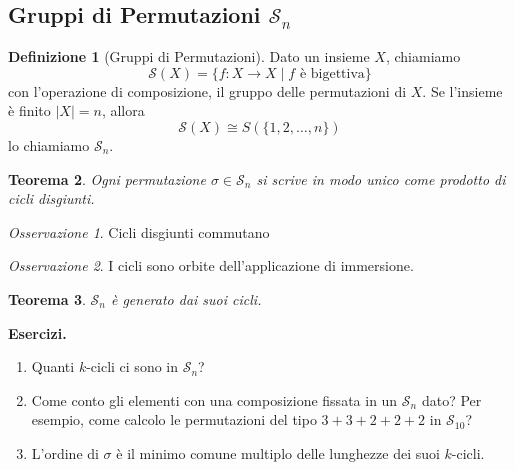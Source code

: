 \documentclass[a4paper]{article}
\newtheorem{theorem}{Teorema}[section]
\theoremstyle{remark}
\newtheorem*{remark}{Osservazione}
\theoremstyle{definition}
\newtheorem{definition}[theorem]{Definizione}
\begin{document}
\subsection{Gruppi di Permutazioni $ \mathcal{S}_n $}
\begin{multicols}{2}
\begin{definition}[Gruppi di Permutazioni]
	Dato un insieme $ X $, chiamiamo
	\[  \mathcal{S}(X) = \{ f: X \to X \mid f  \text{ è bigettiva}  \}  \]
	con l'operazione di composizione, il gruppo delle permutazioni di $ X $. Se l'insieme è finito $ |X| = n $, allora
	\[  \mathcal{S}(X) \cong S(\{ 1 ,2, \dots, n \})  \]
	lo chiamiamo $ \mathcal{S}_n $.
\end{definition}

\begin{theorem}
	Ogni permutazione $ \sigma \in \mathcal{S}_n $ si scrive in modo unico come prodotto di cicli disgiunti.
\end{theorem}
\begin{remark}
	Cicli disgiunti commutano
\end{remark}

\begin{remark}
	I cicli sono orbite dell'applicazione di immersione. 
\end{remark}

\begin{theorem}
	$ \mathcal{S}_n $ è generato dai suoi cicli.
\end{theorem}

\textbf{Esercizi.}
\begin{enumerate}
	\item Quanti $ k $-cicli ci sono in $ \mathcal{S}_n $?
	\item Come conto gli elementi con una composizione fissata in un $ \mathcal{S}_n $ dato? Per esempio, come calcolo le permutazioni del tipo $ 3+3+2+2+2 $ in $ \mathcal{S}_{10} $?
	\item L'ordine di $ \sigma $ è il minimo comune multiplo delle lunghezze dei suoi $ k $-cicli.
\end{enumerate}


\end{multicols}
\end{document}
